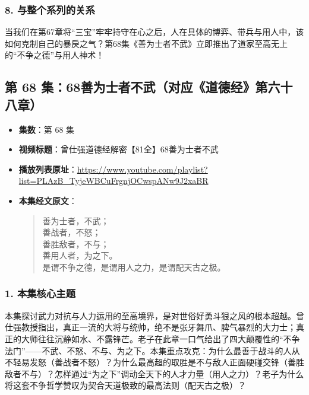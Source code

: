 \subsubsection{8. 与整个系列的关系}
当我们在第67章将“三宝”牢牢持守在心之后，人在具体的博弈、带兵与用人中，该如何克制自己的暴戾之气？第68集《善为士者不武》立即推出了道家至高无上的“不争之德”与用人神术！

\clearpage

\subsection{第 68 集：68善为士者不武（对应《道德经》第六十八章）}
\label{sec:ep68}

\begin{itemize}
    \item \textbf{集数}：第 68 集
    \item \textbf{视频标题}：曾仕强道德经解密【81全】68善为士者不武
    \item \textbf{播放列表原址}：\url{https://www.youtube.com/playlist?list=PLAzB_TyjeWBCuFrgnjOCwspANw9J2xaBR}
    \item \textbf{本集经文原文}：
    \begin{quote}\kaishu
    善为士者，不武；\\
    善战者，不怒；\\
    善胜敌者，不与；\\
    善用人者，为之下。\\
    是谓不争之德，是谓用人之力，是谓配天古之极。
    \end{quote}
\end{itemize}

\subsubsection{1. 本集核心主题}
本集探讨武力对抗与人力运用的至高境界，是对世俗好勇斗狠之风的根本超越。曾仕强教授指出，真正一流的大将与统帅，绝不是张牙舞爪、脾气暴烈的大力士；真正的大师往往沉静如水、不露锋芒。老子在此章一口气给出了四大颠覆性的“不争法门”——不武、不怒、不与、为之下。本集重点攻克：为什么最善于战斗的人从不轻易发怒（善战者不怒）？为什么最高超的取胜是不与敌人正面硬碰交锋（善胜敌者不与）？怎样通过“为之下”调动全天下的人才力量（用人之力）？老子为什么将这套不争哲学赞叹为契合天道极致的最高法则（配天古之极）？

